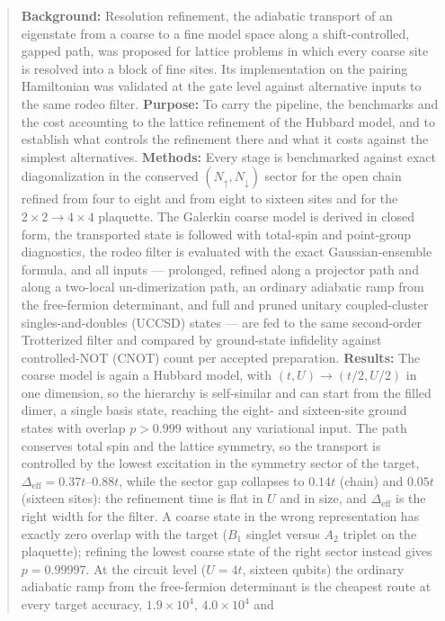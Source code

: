 \documentclass[
  aps,
  prc,
  reprint,
  superscriptaddress,
  floatfix,
  nofootinbib
]{revtex4-2}
\newcommand{\Deff}{\Delta_{\mathrm{eff}}}
\begin{document}
\begin{abstract}
\textbf{Background:} Resolution refinement, the adiabatic transport of an
eigenstate from a coarse to a fine model space along a shift-controlled,
gapped path, was proposed for lattice problems in which every coarse site
is resolved into a block of fine sites.  Its implementation on the pairing
Hamiltonian was validated at the gate level against alternative inputs to
the same rodeo filter.
\textbf{Purpose:} To carry the pipeline, the benchmarks and the cost
accounting to the lattice refinement of the Hubbard model, and to establish
what controls the refinement there and what it costs against the simplest
alternatives.
\textbf{Methods:} Every stage is benchmarked against exact diagonalization
in the conserved $(N_\uparrow,N_\downarrow)$ sector for the open chain
refined from four to eight and from eight to sixteen sites and for the
$2\times2\to4\times4$ plaquette.  The Galerkin coarse model is derived in
closed form, the transported state is followed with total-spin and
point-group diagnostics, the rodeo filter is evaluated with the exact
Gaussian-ensemble formula, and all inputs --- prolonged, refined along a
projector path and along a two-local un-dimerization path, an ordinary
adiabatic ramp from the free-fermion determinant, and full and pruned
unitary coupled-cluster singles-and-doubles (UCCSD) states --- are fed to
the same second-order Trotterized filter and compared by ground-state
infidelity against controlled-NOT (CNOT) count per accepted preparation.
\textbf{Results:} The coarse model is again a Hubbard model, with
$(t,U)\to(t/2,U/2)$ in one dimension, so the hierarchy is self-similar and
can start from the filled dimer, a single basis state, reaching the eight-
and sixteen-site ground states with overlap $p>0.999$ without any
variational input.  The path conserves total spin and the lattice
symmetry, so the transport is controlled by the lowest excitation in the
symmetry sector of the target, $\Deff=0.37t$--$0.88t$, while the sector
gap collapses to $0.14t$ (chain) and $0.05t$ (sixteen sites): the
refinement time is flat in $U$ and in size, and $\Deff$ is the right width
for the filter.  A coarse state in the wrong representation has exactly
zero overlap with the target ($B_1$ singlet versus $A_2$ triplet on the
plaquette); refining the lowest coarse state of the right sector instead
gives $p=0.99997$.  At the circuit level ($U=4t$, sixteen qubits) the
ordinary adiabatic ramp from the free-fermion determinant is the cheapest
route at every target accuracy, $1.9\times10^4$, $4.0\times10^4$ and

\end{abstract}
\end{document}
